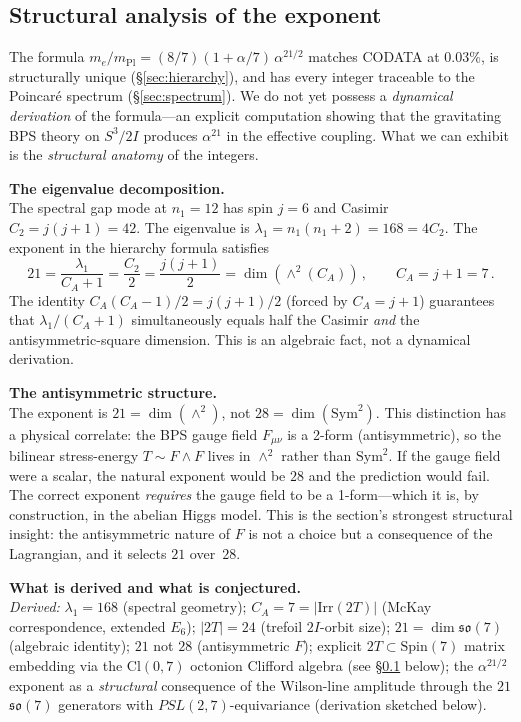 \documentclass[11pt]{article}
\newcommand{\CA}{C_A}
\begin{document}
\subsection{Structural analysis of the exponent}
\label{sec:mechanism}

The formula $m_e/m_\text{Pl} = (8/7)(1{+}\alpha/7)\,
\alpha^{21/2}$ matches CODATA at $0.03\%$, is structurally
unique (\S\ref{sec:hierarchy}), and has every integer traceable
to the Poincar\'e spectrum (\S\ref{sec:spectrum}).  We do not
yet possess a \emph{dynamical derivation} of the formula---an
explicit computation showing that the gravitating BPS theory on
$S^3/2I$ produces $\alpha^{21}$ in the effective coupling.
What we can exhibit is the \emph{structural anatomy} of the
integers.

\medskip
\noindent\textbf{The eigenvalue decomposition.}\\
The spectral gap mode at $n_1 = 12$ has spin $j = 6$ and
Casimir $C_2 = j(j+1) = 42$.  The eigenvalue is
$\lambda_1 = n_1(n_1{+}2) = 168 = 4 C_2$.  The exponent in
the hierarchy formula satisfies
\begin{equation}
\label{eq:exponent-origin}
  21 = \frac{\lambda_1}{\CA + 1} = \frac{C_2}{2}
     = \frac{j(j+1)}{2}
     = \dim(\wedge^2(\CA))\,,
  \qquad \CA = j{+}1 = 7\,.
\end{equation}
The identity $\CA(\CA{-}1)/2 = j(j{+}1)/2$ (forced by
$\CA = j{+}1$) guarantees that $\lambda_1/(\CA{+}1)$
simultaneously equals half the Casimir \emph{and} the
antisymmetric-square dimension.  This is an algebraic fact,
not a dynamical derivation.

\medskip
\noindent\textbf{The antisymmetric structure.}\\
The exponent is $21 = \dim(\wedge^2)$, not $28 = \dim(\mathrm{Sym}^2)$.
This distinction has a physical correlate: the BPS gauge field
$F_{\mu\nu}$ is a 2-form (antisymmetric), so the bilinear
stress-energy $T \sim F \wedge F$ lives in $\wedge^2$ rather
than $\mathrm{Sym}^2$.  If the gauge field were a scalar, the
natural exponent would be $28$ and the prediction would fail.
The correct exponent \emph{requires} the gauge field to be a
1-form---which it is, by construction, in the abelian Higgs
model.  This is the section's strongest structural insight: the
antisymmetric nature of $F$ is not a choice but a consequence
of the Lagrangian, and it selects $21$ over~$28$.

\medskip
\noindent\textbf{What is derived and what is conjectured.}\\
\emph{Derived:} $\lambda_1 = 168$ (spectral geometry);
$\CA = 7 = |\mathrm{Irr}(2T)|$ (McKay correspondence, extended
$E_6$); $|2T| = 24$ (trefoil $2I$-orbit size); $21 = \dim\mathfrak{so}(7)$
(algebraic identity); $21$ not $28$ (antisymmetric $F$);
explicit $2T \subset \mathrm{Spin}(7)$ matrix embedding via the
$\mathrm{Cl}(0, 7)$ octonion Clifford algebra (see
\S\ref{sec:mechanism} below); the $\alpha^{21/2}$ exponent as a
\emph{structural} consequence of the Wilson-line amplitude through
the $21$ $\mathfrak{so}(7)$ generators with $PSL(2,7)$-equivariance
(derivation sketched below).
\end{document}
